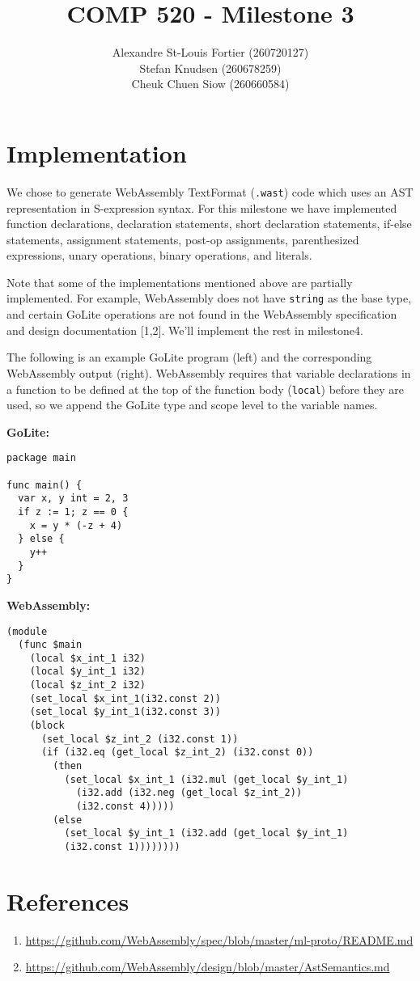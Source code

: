 \documentclass{article}
\begin{document}
\title{COMP 520 - Milestone 3}
\author{
Alexandre St-Louis Fortier (260720127)\\
Stefan Knudsen (260678259)\\
Cheuk Chuen Siow (260660584)}
\maketitle

\raggedright
\section*{Implementation}
We chose to generate WebAssembly TextFormat (\verb|.wast|) code which uses an AST representation in S-expression syntax. For this milestone we have implemented function declarations, declaration statements, short declaration statements, if-else statements, assignment statements, post-op assignments, parenthesized expressions, unary operations, binary operations, and literals. 

Note that some of the implementations mentioned above are partially implemented. For example, WebAssembly does not have \verb|string| as the base type, and certain GoLite operations are not found in the WebAssembly specification and design documentation [1,2]. We'll implement the rest in milestone4.

The following is an example GoLite program (left) and the corresponding WebAssembly output (right). WebAssembly requires that variable declarations in a function to be defined at the top of the function body (\verb|local|) before they are used, so we append the GoLite type and scope level to the variable names.

\begin{minipage}[t]{0.3\textwidth}
\textbf{GoLite:}
\begin{lstlisting}
package main

func main() {
  var x, y int = 2, 3
  if z := 1; z == 0 {
    x = y * (-z + 4)
  } else {
    y++
  }
}
\end{lstlisting}
\end{minipage}
\begin{minipage}[t]{0.6\textwidth}
\textbf{WebAssembly:}
\begin{lstlisting}
(module
  (func $main
    (local $x_int_1 i32)
    (local $y_int_1 i32)
    (local $z_int_2 i32)
    (set_local $x_int_1(i32.const 2))
    (set_local $y_int_1(i32.const 3))
    (block
      (set_local $z_int_2 (i32.const 1))
      (if (i32.eq (get_local $z_int_2) (i32.const 0))
        (then
          (set_local $x_int_1 (i32.mul (get_local $y_int_1) 
            (i32.add (i32.neg (get_local $z_int_2)) 
            (i32.const 4)))))
        (else
          (set_local $y_int_1 (i32.add (get_local $y_int_1) 
          (i32.const 1))))))))
\end{lstlisting}
\end{minipage}

\section*{References}
\begin{enumerate}
	\item \url{https://github.com/WebAssembly/spec/blob/master/ml-proto/README.md}
	\item \url{https://github.com/WebAssembly/design/blob/master/AstSemantics.md}
\end{enumerate}
\end{document}
